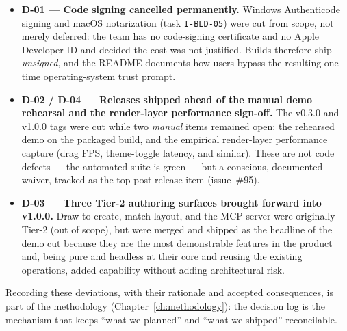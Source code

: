 \begin{itemize}[leftmargin=1.5em]
  \item \textbf{D-01 --- Code signing cancelled permanently.} Windows Authenticode
        signing and macOS notarization (task \texttt{I-BLD-05}) were cut from scope,
        not merely deferred: the team has no code-signing certificate and no Apple
        Developer ID and decided the cost was not justified. Builds therefore ship
        \emph{unsigned}, and the README documents how users bypass the resulting
        one-time operating-system trust prompt.
  \item \textbf{D-02 / D-04 --- Releases shipped ahead of the manual demo
        rehearsal and the render-layer performance sign-off.} The v0.3.0 and
        v1.0.0 tags were cut while two \emph{manual} items remained open: the
        rehearsed demo on the packaged build, and the empirical render-layer
        performance capture (drag FPS, theme-toggle latency, and similar). These
        are not code defects --- the automated suite is green --- but a conscious,
        documented waiver, tracked as the top post-release item (issue~\#95).
  \item \textbf{D-03 --- Three Tier-2 authoring surfaces brought forward into
        v1.0.0.} Draw-to-create, match-layout, and the MCP server were originally
        Tier-2 (out of scope), but were merged and shipped as the headline of the
        demo cut because they are the most demonstrable features in the product
        and, being pure and headless at their core and reusing the existing
        operations, added capability without adding architectural risk.
\end{itemize}

Recording these deviations, with their rationale and accepted consequences, is
part of the methodology (Chapter~\ref{ch:methodology}): the decision log is the
mechanism that keeps ``what we planned'' and ``what we shipped'' reconcilable.
